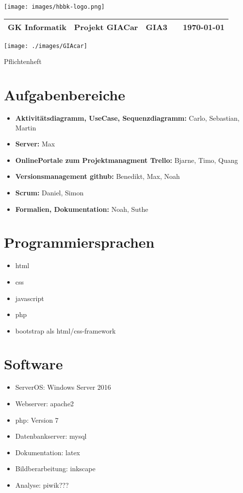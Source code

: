 \documentclass[11pt,a4paper]{scrbook}
\begin{document}
\raggedleft\texttt{[image: images/hbbk-logo.png]}
\\
\begin{tabular}{p{4cm} p{5cm} p{1.5cm} p{1.5cm} p{3cm}}
  \tabularnewline
  \textbf{GK Informatik} & \textbf{Projekt GIACar}    & GIA3    &  & {\today} \tabularnewline 
  \hline
\end{tabular}


\centering
\texttt{[image: ./images/GIAcar]}

\centering\Huge{Pflichtenheft} \\

\normalsize
\section*{Aufgabenbereiche}
	\begin{itemize}
	\item \textbf{Aktivitätsdiagramm, UseCase, Sequenzdiagramm:} Carlo, Sebastian, Martin
	\item \textbf{Server:} Max
	\item \textbf{OnlinePortale zum Projektmanagment Trello:} Bjarne, Timo, Quang
	\item \textbf{Versionsmanagement github:} Benedikt, Max, Noah
	\item \textbf{Scrum:} Daniel, Simon
	\item \textbf{Formalien, Dokumentation:} Noah, Suthe
	\end{itemize}
\section*{Programmiersprachen}
\begin{itemize}
\item html
\item css
\item javascript
\item php
\item bootstrap als html/css-framework
\end{itemize}
\section*{Software}
\begin{itemize}
\item ServerOS: Windows Server 2016
\item Webserver: apache2
\item php: Version 7
\item Datenbankserver: mysql
\item Dokumentation: latex
\item Bildberarbeitung: inkscape 
\item Analyse: piwik???
\end{itemize}
\end{document}
